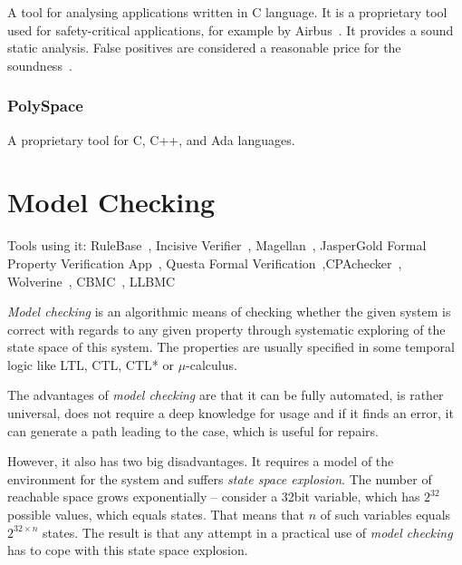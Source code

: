A tool for analysing applications written in C language. It is a
proprietary tool used for safety-critical applications, for example by
Airbus~\cite{KrenaVojnarOverview}. It provides a sound static analysis.
False positives are considered a reasonable price for the soundness~\cite{Astree1}.

\subsubsection{PolySpace}

A proprietary tool for C, C++, and Ada languages.

\section{Model Checking}\label{chap:fav:modelChecking}
Tools using it: RuleBase~\cite{KrenaVojnarOverview}, Incisive Verifier~\cite{KrenaVojnarOverview}, Magellan~\cite{KrenaVojnarOverview}, JasperGold Formal Property Verification App~\cite{KrenaVojnarOverview}, Questa Formal Verification~\cite{KrenaVojnarOverview},CPAchecker~\cite{KrenaVojnarOverview}, Wolverine~\cite{KrenaVojnarOverview}, CBMC~\cite{KrenaVojnarOverview}, LLBMC~\cite{KrenaVojnarOverview}

{\em Model checking} is an algorithmic means of checking whether the given
system is correct with regards to any given property through systematic
exploring of the state space of this system. The properties are usually specified in some temporal logic like LTL, CTL, CTL* or $\mu$-calculus.

The advantages of {\em model checking} are that it can be fully automated, is rather universal, does not require a deep knowledge for usage and if it finds an error, it can generate a path leading to the case, which is useful for repairs.

However, it also has two big disadvantages. It requires a model of the environment for the system and suffers {\em state space explosion}. The number of reachable space grows exponentially -- consider a 32bit variable, which has $2^{32}$ possible values, which equals states. That means that $n$ of such variables equals $2^{32\times n}$ states. The result is that any attempt in a practical use of {\em model checking} has to cope with this state space explosion.

